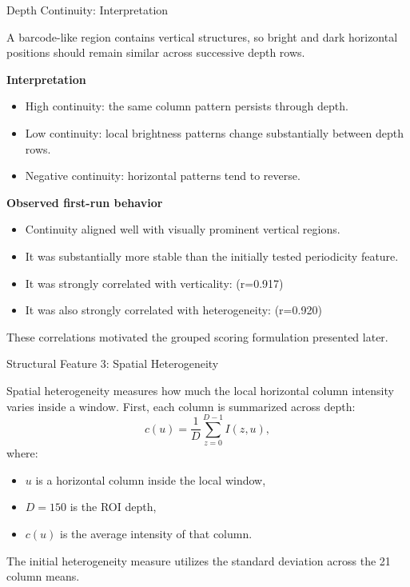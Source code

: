 \documentclass[aspectratio=169]{beamer}
\begin{document}
\begin{frame}{Depth Continuity: Interpretation}

A barcode-like region contains vertical structures, so bright and dark
horizontal positions should remain similar across successive depth rows.

\vspace{0.3cm}

\textbf{Interpretation}

\begin{itemize}
    \item High continuity: the same column pattern persists through depth.
    \item Low continuity: local brightness patterns change substantially
    between depth rows.
    \item Negative continuity: horizontal patterns tend to reverse.
\end{itemize}

\vspace{0.3cm}

\textbf{Observed first-run behavior}

\begin{itemize}
    \item Continuity aligned well with visually prominent vertical regions.
    \item It was substantially more stable than the initially tested
    periodicity feature.
    \item It was strongly correlated with verticality: (r=0.917)
    \item It was also strongly correlated with heterogeneity: (r=0.920)
\end{itemize}

These correlations motivated the grouped scoring formulation presented later.

\end{frame}

\begin{frame}{Structural Feature 3: Spatial Heterogeneity}

Spatial heterogeneity measures how much the local horizontal column intensity
varies inside a window.
First, each column is summarized across depth:
\[
c(u)
=
\frac{1}{D}
\sum_{z=0}^{D-1}
I(z,u),
\]
where:
\begin{itemize}
    \item \(u\) is a horizontal column inside the local window,
    \item \(D=150\) is the ROI depth,
    \item \(c(u)\) is the average intensity of that column.
\end{itemize}
The initial heterogeneity measure utilizes the standard deviation across the 21 column means.
\end{frame}
\end{document}
